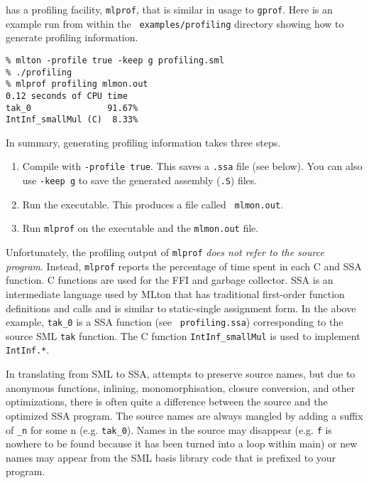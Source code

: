 
{\mlton} has a profiling facility, {\tt mlprof}, that is similar in
usage to {\tt gprof}.  Here is an example run from within the {\tt
  examples/profiling} directory showing how to generate profiling
information.

\begin{verbatim}
% mlton -profile true -keep g profiling.sml
% ./profiling
% mlprof profiling mlmon.out
0.12 seconds of CPU time
tak_0               91.67%
IntInf_smallMul (C)  8.33%
\end{verbatim}
In summary, generating profiling information takes three steps.
\begin{enumerate}
  
\item Compile with {\tt -profile true}.  This saves a {\tt .ssa} file
  (see below).  You can also use {\tt -keep g} to save the generated
  assembly ({\tt .S}) files.
  
\item Run the executable.  This produces a file called {\tt
    mlmon.out}.
  
\item Run {\tt mlprof} on the executable and the {\tt mlmon.out} file.

\end{enumerate}
Unfortunately, the profiling output of {\tt mlprof} {\em
does not refer to the source program}.  Instead, {\tt mlprof} reports the
percentage of time spent in each C and SSA function.  C functions are
used for the FFI and garbage collector.  SSA is an intermediate
language used by MLton that has traditional first-order function
definitions and calls and is similar to static-single assignment form.
In the above example, {\tt tak\_0} is a SSA function (see {\tt
  profiling.ssa}) corresponding to the source SML {\tt tak} function.
The C function {\tt IntInf\_smallMul} is used to implement {\tt
  IntInf.*}.

In translating from SML to SSA, {\mlton} attempts to preserve source
names, but due to anonymous functions, inlining, monomorphisation,
closure conversion, and other optimizations, there is often quite a
difference between the source and the optimized SSA program.  The
source names are always mangled by adding a suffix of {\tt \_n} for
some n (e.g. {\tt tak\_0}).  Names in the source may disappear (e.g.
{\tt f} is nowhere to be found because it has been turned into a loop
within main) or new names may appear from the SML basis library code
that is prefixed to your program.

